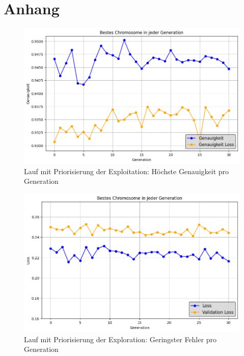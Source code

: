 
\printbibliography

\appendix

\clearpage
\section*{Anhang}
\begin{figure}[p]
	\centering
	\includegraphics[width=1\linewidth]{acc.png}
	\caption{Lauf mit Priorisierung der Exploitation: Höchste Genauigkeit pro Generation}
	\label{fig:enter-label}
\end{figure}

\begin{figure}[p]
	\centering
	\includegraphics[width=1\linewidth]{loss_explore.png}
	\caption{Lauf mit Priorisierung der Exploration: Geringster Fehler pro Generation}
	\label{fig:enter-label}
\end{figure}

